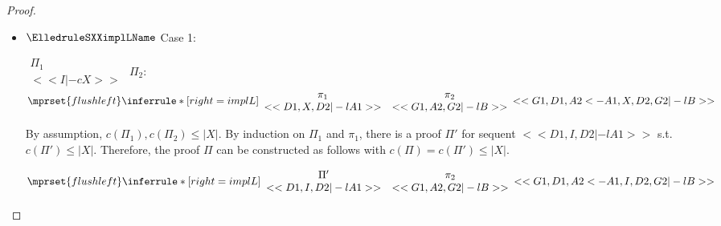 \begin{proof}
\begin{enumerate}
\begin{itemize}
  \item $\ElledruleSXXimplLName$ Case 1:
      \begin{center}
        \scriptsize
        \begin{math}
          \begin{array}{c}
            \Pi_1 \\
            {<<I |-c X>>}
          \end{array}
        \end{math}
        \qquad\qquad
        $\Pi_2$:
        \begin{math}
          $$\mprset{flushleft}
          \inferrule* [right={\tiny implL}] {
            {
              \begin{array}{cc}
                \pi_1 & \pi_2 \\
                {<<D1, X, D2 |-l A1>>} & {<<G1, A2, G2 |-l B>>}
              \end{array}
            }
          }{<<G1, D1, A2 <- A1, X, D2, G2 |-l B>>}
        \end{math}
      \end{center}
      By assumption, $c(\Pi_1),c(\Pi_2)\leq |X|$. By induction on $\Pi_1$ and $\pi_1$, there is
      a proof $\Pi'$ for sequent $<<D1, I, D2 |-l A1>>$ s.t. $c(\Pi') \leq |X|$. Therefore, the
      proof $\Pi$ can be constructed as follows with $c(\Pi) = c(\Pi') \leq |X|$.
      \begin{center}
        \scriptsize
        \begin{math}
          $$\mprset{flushleft}
          \inferrule* [right={\tiny implL}] {
            {
              \begin{array}{cc}
                \Pi' & \pi_2 \\
                {<<D1, I, D2 |-l A1>>} & {<<G1, A2, G2 |-l B>>}
              \end{array}
            }
          }{<<G1, D1, A2 <- A1, I, D2, G2 |-l B>>}
        \end{math}
      \end{center}


\end{itemize}
\end{enumerate}
\end{proof}
